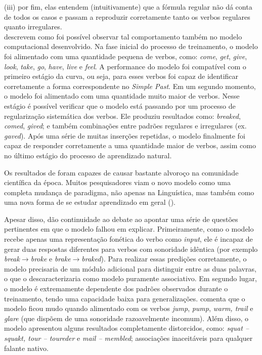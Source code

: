 (iii) por fim, elas entendem (intuitivamente) que a fórmula regular não dá conta de todos os casos e passam a reproduzir corretamente tanto os verbos regulares quanto irregulares. \\


\cite{rumelhart:1986} descrevem como foi possível observar tal comportamento também no modelo computacional desenvolvido.
Na fase inicial do processo de treinamento, o modelo foi alimentado com uma quantidade pequena de verbos, como: \textit{come}, \textit{get}, \textit{give}, \textit{look}, \textit{take}, \textit{go}, \textit{have}, \textit{live} e \textit{feel}. A performance do modelo foi compatível com o primeiro estágio da curva, ou seja, para esses verbos foi capaz de identificar corretamente a forma correspondente no \textit{Simple Past}. Em um segundo momento, o modelo foi alimentado com uma quantidade muito maior de verbos. Nesse estágio é possível verificar que o modelo está passando por um processo de regularização sistemática dos verbos. Ele produziu resultados como: \textit{breaked}, \textit{comed}, \textit{gived}; e também combinações entre padrões regulares e irregulares (ex. \textit{gaved}). 
Após uma série de muitas inserções repetidas, o modelo finalmente foi capaz de responder corretamente a uma quantidade maior de verbos, assim como no último estágio do processo de aprendizado natural. 

Os resultados de \cite{rumelhart:1986} foram capazes de causar bastante alvoroço na comunidade científica da época. Muitos pesquisadores viam o novo modelo como uma completa mudança de paradigma, não apenas na Linguística, mas também como uma nova forma de se estudar aprendizado em geral (\cite{Schneider1987}). 

Apesar disso, \cite{Pinker:1988} dão continuidade ao debate ao apontar uma série de questões pertinentes em que o modelo falhou em explicar. Primeiramente, como o modelo recebe apenas uma representação fonética do verbo como \textit{input}, ele é incapaz de gerar duas respostas diferentes para verbos com sonoridade idêntica (por exemplo \textit{break}$\rightarrow$\textit{broke} e \textit{brake}$\rightarrow$\textit{braked}). Para realizar essas predições corretamente, o modelo precisaria de um módulo adicional para distinguir entre as duas palavras, o que o descaracterizaria como modelo puramente associativo. Em segundo lugar, o modelo é extremamente dependente dos padrões observados durante o treinamento, tendo uma capacidade baixa para generalizações. \cite{Pinker:1999} comenta que o modelo ficou mudo quando alimentado com os verbos \textit{jump}, \textit{pump}, \textit{warm, trail} e \textit{glare} (que dispõem de uma sonoridade razoavelmente incomum). Além disso, o modelo apresentou alguns resultados completamente distorcidos, como: \textit{squat – squakt, tour – toureder} e \textit{mail – membled}; associações inaceitáveis para qualquer falante nativo. 

